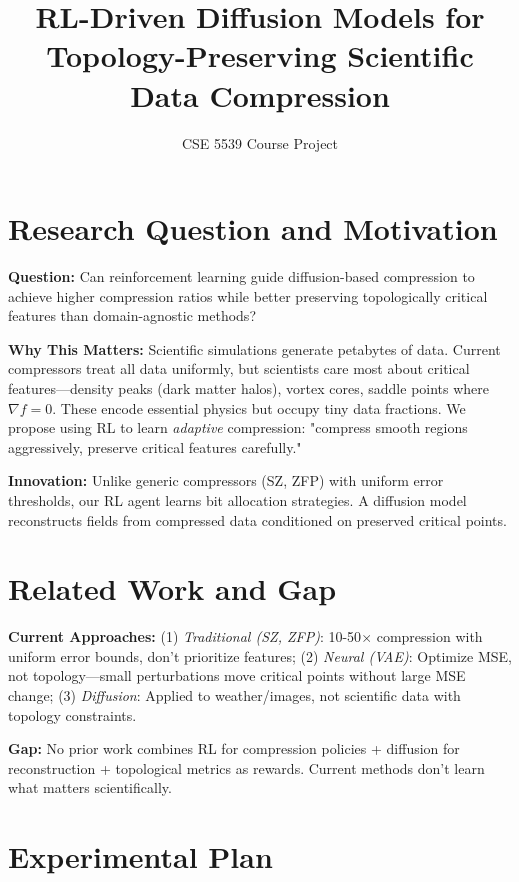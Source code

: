 \documentclass[11pt]{article}
\title{\textbf{RL-Driven Diffusion Models for Topology-Preserving Scientific Data Compression}}
\author{CSE 5539 Course Project}
\date{}
\begin{document}
\maketitle
\vspace{-0.8cm}

\section{Research Question and Motivation}

\textbf{Question:} Can reinforcement learning guide diffusion-based compression to achieve higher compression ratios while better preserving topologically critical features than domain-agnostic methods?

\textbf{Why This Matters:} Scientific simulations generate petabytes of data. Current compressors treat all data uniformly, but scientists care most about critical features—density peaks (dark matter halos), vortex cores, saddle points where $\nabla f = 0$. These encode essential physics but occupy tiny data fractions. We propose using RL to learn \textit{adaptive} compression: "compress smooth regions aggressively, preserve critical features carefully."

\textbf{Innovation:} Unlike generic compressors (SZ, ZFP) with uniform error thresholds, our RL agent learns bit allocation strategies. A diffusion model reconstructs fields from compressed data conditioned on preserved critical points.

\section{Related Work and Gap}

\textbf{Current Approaches:} (1) \textit{Traditional (SZ, ZFP)}: 10-50$\times$ compression with uniform error bounds, don't prioritize features; (2) \textit{Neural (VAE)}: Optimize MSE, not topology—small perturbations move critical points without large MSE change; (3) \textit{Diffusion}: Applied to weather/images, not scientific data with topology constraints.

\textbf{Gap:} No prior work combines RL for compression policies + diffusion for reconstruction + topological metrics as rewards. Current methods don't learn what matters scientifically.

\section{Experimental Plan}
\end{document}
